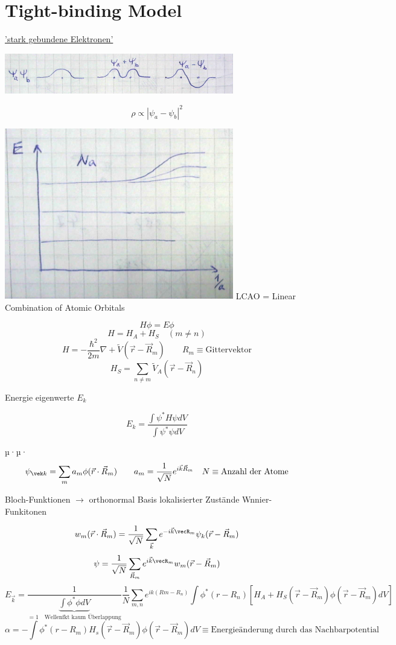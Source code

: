 \section{Tight-binding Model}

\underline{'stark gebundene Elektronen'}


\includegraphics[width=0.75\textwidth]{kap06_39.png}

\[\rho \propto |\psi_a-\psi_b|^2\]


\includegraphics[width=0.75\textwidth]{kap06_40.png}
LCAO = Linear Combination of Atomic Orbitals

\[H\phi = E\phi\]
\[H= H_A+H_S\quad (m\neq n)\]
\[H = -\frac{\hbar^2}{2m}\nabla + \tilde V(\vec r - \vec R_m)\qquad R_m\equiv\text{Gittervektor}\]
\[H_S = \sum_{n\neq m}\tilde V_A(\vec r - \vec R_n)\]

Energie eigenwerte \(E_k\)

\[ E_k = \frac{\int \psi^* H\psi dV}{\int \psi^*\psi dV}\]

 µ·µ·\[\psi_{\vek k} = \sum_m a_m\phi(\vec r\cdot\vec R_m)\qquad a_m=\frac{1}{\sqrt{N}} e^{i\vec k\vec R_m}\quad N\equiv\text{Anzahl der Atome}\]


Bloch-Funktionen \(\rightarrow \) orthonormal Basis lokalisierter Zustände Wnnier-Funkitonen

\[w_m(\vec r\cdot\vec R_m) = \frac{1}{\sqrt{N}}\sum_{\vec k}e^{-i\vec k\vecR_m}\psi_k(\vec r- \vec R_m)\]
\[\psi =\frac{1}{\sqrt{N}}\sum_{\vec R_m}e^{i\vec k\vecR_m}w_m(\vec r- \vec R_m) \]
\[E_{\vec k} = \frac{1}{\underbrace{\int \phi^*\phi dV}_{=1\quad\text{Wellenfkt kaum Überlappung}}}\frac{1}{N}\sum_{m,n}e^{ik(Rm-R_n)}\int\phi^*(r-R_n)[H_A+H_S(\vec r-\vec R_m)\phi(\vec r-\vec R_m)dV]\]
\[\alpha = -\int \phi^*(r-R_m)H_s(\vec r-\vec R_m)\phi(\vec r -\vec R_m)dV \equiv\text{Energieänderung durch das Nachbarpotential}\]

